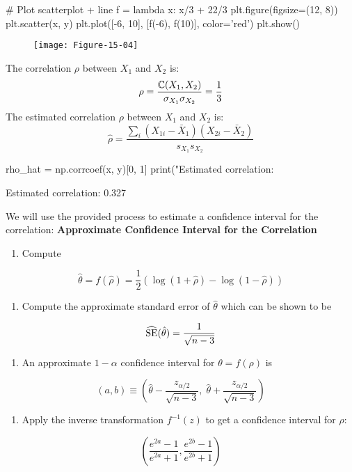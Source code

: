 \begin{python}
# Plot scatterplot + line
f = lambda x: x/3 + 22/3
plt.figure(figsize=(12, 8))
plt.scatter(x, y)
plt.plot([-6, 10], [f(-6), f(10)], color='red')
plt.show()
\end{python}

\begin{figure}[H]
\centering
\texttt{[image: Figure-15-04]}
\end{figure}

The correlation \(\rho\) between \(X_{1}\) and \(X_{2}\) is:
\[
\rho = \frac{\operatorname{\mathbb{C}}(X_{1}, X_{2})}{\sigma_{X_{1}} \sigma_{X_{2}}} = \frac{1}{3}
\]
The estimated correlation \(\rho\) between \(X_{1}\) and \(X_{2}\) is:
\[
\hat{\rho} = \frac{\sum_{i} (X_{1i} - \bar{X}_{1})(X_{2i} - \bar{X}_{2})}{s_{X_{1}} s_{X_{2}}}
\]

\begin{python}
rho_hat = np.corrcoef(x, y)[0, 1]
print("Estimated correlation: %
\end{python}
\begin{console}
Estimated correlation: 0.327
\end{console}
We will use the provided process to estimate a confidence interval for
the correlation:
\textbf{Approximate Confidence Interval for the Correlation}
\begin{enumerate}[tightlist,label={\arabic*.}]
\item
  Compute
\end{enumerate}
\[
\hat{\theta} = f(\hat{\rho}) = \frac{1}{2} \left( \log(1 + \hat{\rho}) - \log(1 - \hat{\rho})\right)
\]
\begin{enumerate}[tightlist,label={\arabic*.},resume]
\item
  Compute the approximate standard error of \(\hat{\theta}\) which can
  be shown to be
\end{enumerate}
\[
\widehat{\operatorname{\mathrm{SE}}}(\hat{\theta}) = \frac{1}{\sqrt{n - 3}}
\]
\begin{enumerate}[tightlist,label={\arabic*.},resume]
\item
  An approximate \(1 - \alpha\) confidence interval for
  \(\theta = f(\rho)\) is
\end{enumerate}
\[
(a, b) \equiv \left(\hat{\theta} - \frac{z_{\alpha/2}}{\sqrt{n - 3}}, \; \hat{\theta} + \frac{z_{\alpha/2}}{\sqrt{n - 3}} \right)
\]
\begin{enumerate}[tightlist,label={\arabic*.},resume]
\item
  Apply the inverse transformation \(f^{-1}(z)\) to get a confidence
  interval for \(\rho\):
\end{enumerate}
\[
\left( \frac{e^{2a} - 1}{e^{2a} + 1}, \frac{e^{2b} - 1}{e^{2b} + 1} \right)
\]

